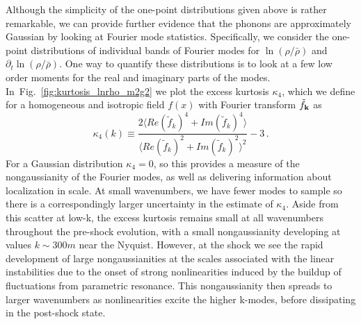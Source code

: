 \documentclass[11pt,a4paper]{article}
\newcommand{\figref}[1]{Fig.~\ref{#1}}
\def\lnr{\ln(\rho/\bar{\rho})}
\def\dlnr{\partial_t\ln(\rho/\bar{\rho})}
\begin{document}
Although the simplicity of the one-point distributions given above is rather remarkable, we can provide further evidence that the phonons are approximately Gaussian by looking at Fourier mode statistics.
Specifically, we consider the one-point distributions of individual bands of Fourier modes for $\lnr$ and $\dlnr$.
One way to quantify these distributions is to look at a few low order moments for the real and imaginary parts of the modes.
In~\figref{fig:kurtosis_lnrho_m2g2} we plot the excess kurtosis $\kappa_4$, which we define for a homogeneous and isotropic field $f(x)$ with Fourier transform $\tilde{f}_{\bf k}$ as
\begin{equation}
  \kappa_4(k) \equiv \frac{2\langle Re(\tilde{f}_k)^4+Im(\tilde{f}_k)^4\rangle}{\langle Re(\tilde{f}_k)^2+Im(\tilde{f}_k)^2\rangle^2} - 3 \, .
  \label{eqn:kurtosis_def}
\end{equation}
For a Gaussian distribution $\kappa_4=0$, so this provides a measure of the nongaussianity of the Fourier modes, as well as delivering information about localization in scale.
At small wavenumbers, we have fewer modes to sample so there is a correspondingly larger uncertainty in the estimate of $\kappa_4$.
Aside from this scatter at low-k, the excess kurtosis remains small at all wavenumbers throughout the pre-shock evolution, with a small nongaussianity developing at values $k \sim 300m$ near the Nyquist.
However, at the shock we see the rapid development of large nongaussianities at the scales associated with the linear instabilities due to the onset of strong nonlinearities induced by the buildup of fluctuations from parametric resonance.
This nongaussianity then spreads to larger wavenumbers as nonlinearities excite the higher k-modes, before dissipating in the post-shock state.
\end{document}
